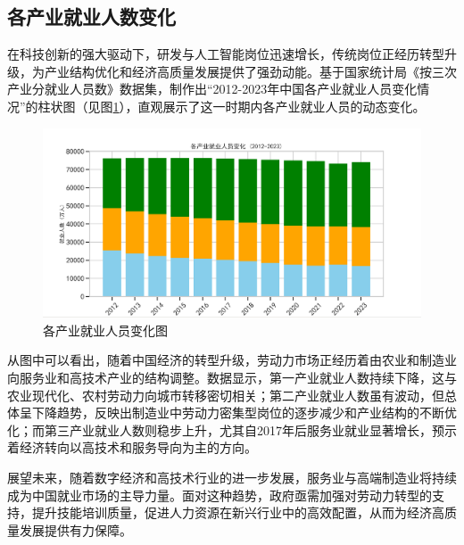 \subsection{各产业就业人数变化}
在科技创新的强大驱动下，研发与人工智能岗位迅速增长，传统岗位正经历转型升级，为产业结构优化和经济高质量发展提供了强劲动能。基于国家统计局《按三次产业分就业人员数》数据集，制作出“2012-2023年中国各产业就业人员变化情况”的柱状图（见图\ref{各产业就业人员变化}），直观展示了这一时期内各产业就业人员的动态变化。
\begin{figure}[H]
    \centering
    \includegraphics[width=0.7\linewidth]{figure/20各产业就业人员变化.png}
    \caption{各产业就业人员变化图}
    \label{各产业就业人员变化}
\end{figure}
从图中可以看出，随着中国经济的转型升级，劳动力市场正经历着由农业和制造业向服务业和高技术产业的结构调整。数据显示，第一产业就业人数持续下降，这与农业现代化、农村劳动力向城市转移密切相关；第二产业就业人数虽有波动，但总体呈下降趋势，反映出制造业中劳动力密集型岗位的逐步减少和产业结构的不断优化；而第三产业就业人数则稳步上升，尤其自2017年后服务业就业显著增长，预示着经济转向以高技术和服务导向为主的方向。

展望未来，随着数字经济和高技术行业的进一步发展，服务业与高端制造业将持续成为中国就业市场的主导力量。面对这种趋势，政府亟需加强对劳动力转型的支持，提升技能培训质量，促进人力资源在新兴行业中的高效配置，从而为经济高质量发展提供有力保障。